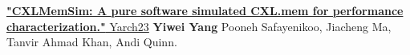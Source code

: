 \documentclass{resume}
\newcommand{\en}[1]{#1}
\newcommand{\zh}[1]{}
\begin{document}

\href{https://arxiv.org/pdf/2303.06153}{\textbf{"CXLMemSim: A pure software simulated CXL.mem for performance characterization."} Yarch23} \textbf{Yiwei Yang} Pooneh Safayenikoo, Jiacheng Ma, Tanvir Ahmad Khan, Andi Quinn.

      
\end{document}

